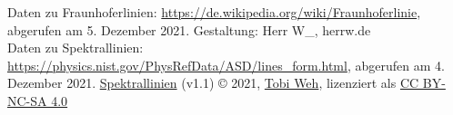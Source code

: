 \documentclass{article}
\begin{document}



\vfill
Daten zu Fraunhoferlinien: \url{https://de.wikipedia.org/wiki/Fraunhoferlinie},
   abgerufen am 5. Dezember 2021.
\hfill
Gestaltung: Herr W\_, herrw.de\\
Daten zu Spektrallinien: \url{https://physics.nist.gov/PhysRefData/ASD/lines_form.html},
   abgerufen am 4. Dezember 2021.
\hfill
\href{https://github.com/tweh/spektrallinien}{Spektrallinien} (v1.1) © 2021, \href{https://herrw.de}{Tobi Weh}, lizenziert als \href{http://creativecommons.org/licenses/by-nc-sa/4.0/}{CC BY-NC-SA 4.0} \ccbyncsa
\end{document}
